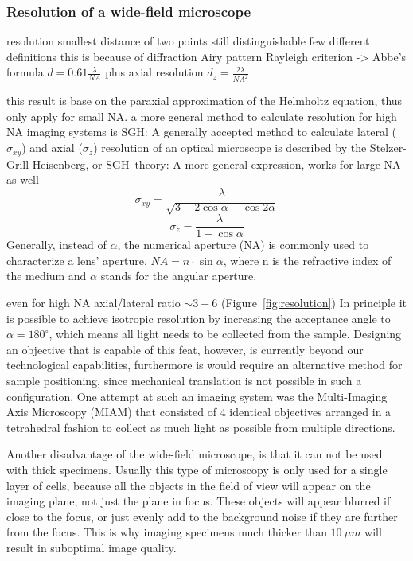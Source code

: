 \documentclass{diploma_style}
\begin{document}
\subsubsection{Resolution of a wide-field microscope}

resolution
smallest distance of two points still distinguishable
few different definitions
this is because of diffraction
Airy pattern
Rayleigh criterion -> Abbe's formula
$d = 0.61 \frac{\lambda}{NA}$
plus axial resolution
$d_z = \frac{2\lambda}{NA^2}$

this result is base on the paraxial approximation of the Helmholtz equation, thus only apply for small NA.
a more general method to calculate resolution for high NA imaging systems is SGH:
A generally accepted method to calculate lateral ($\sigma_{xy}$) and axial ($\sigma_{z}$) resolution of an optical microscope is described by the Stelzer-Grill-Heisenberg, or SGH~theory\cite{grill_method_1999, stelzer_uncertainty_2000}:
A more general expression, works for large NA as well
\begin{equation} \label{eq:latres}
\sigma_{xy}=\frac{\lambda}{\sqrt{3-2 \cos \alpha - \cos 2 \alpha}}
\end{equation}
\begin{equation} \label{eq:axres}
\sigma_z = \frac{\lambda}{1-\cos \alpha}
\end{equation}
Generally, instead of $\alpha$, the numerical aperture (NA) is commonly used to characterize a lens' aperture. 
$NA=n\cdot \sin \alpha$, where n is the refractive index of the medium and $\alpha$ stands for the angular aperture.

even for high NA axial/lateral ratio $\sim 3-6$ (Figure~\ref{fig:resolution})
In principle it is possible to achieve isotropic resolution by increasing the acceptance angle to $\alpha = 180^\circ$, which means all light needs to be collected from the sample. Designing an objective that is capable of this feat, however, is currently beyond our technological capabilities, furthermore is would require an alternative method for sample positioning, since mechanical translation is not possible in such a configuration. One attempt at such an imaging system was the Multi-Imaging Axis Microscopy (MIAM) \cite{swoger_multiple_2003,swoger_multi-view_2007} that consisted of 4 identical objectives arranged in a tetrahedral fashion to collect as much light as possible from multiple directions. 

Another disadvantage of the wide-field microscope, is that it can not be used with thick specimens. Usually this type of microscopy is only used for a single layer of cells, because all the objects in the field of view will appear on the imaging plane, not just the plane in focus. These objects will appear blurred if close to the focus, or just evenly add to the background noise if they are further from the focus. This is why imaging specimens much thicker than $10\ \mu m$ will result in suboptimal image quality.
\end{document}
